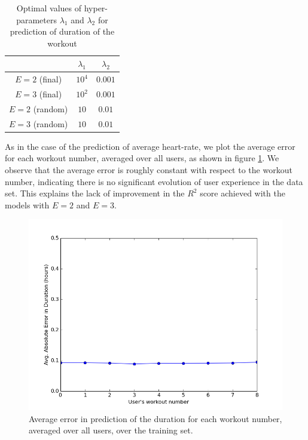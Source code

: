 \documentclass{acm_proc_article-sp}
\begin{document}
\begin{table}[H]
\centering
\begin{tabular}{|c|c|c|} \hline
& $\lambda_1$ & $\lambda_2$ \\ \hline
$E = 2$ (final) & $10^4$ & $0.001$ \\ \hline
$E = 3$ (final) & $10^2$ & $0.001$ \\ \hline
$E = 2$ (random) & $10$ & $0.01$ \\ \hline
$E = 3$ (random) & $10$ & $0.01$ \\ \hline
\end{tabular}
\caption{Optimal values of hyper-parameters $\lambda_1$ and $\lambda_2$ for prediction of duration of the workout}
\label{tableDurationHyperparams}
\end{table}

As in the case of the prediction of average heart-rate, we plot the average error for each workout number, averaged over all users, as shown in figure \ref{figDurationAvgErrorE1}. We observe that the average error is roughly constant with respect to the workout number, indicating there is no significant evolution of user experience in the data set. This explains the lack of improvement in the $R^2$ score achieved with the models with $E = 2$ and $E = 3$.

\begin{figure}[h]
\centering
\includegraphics[scale=0.35]{../src/plots/duration_error_vs_workout_E1}
\caption{\label{figDurationAvgErrorE1}  Average error in prediction of the duration for each workout number, averaged over all users, over the training set.}
\end{figure}
\end{document}
